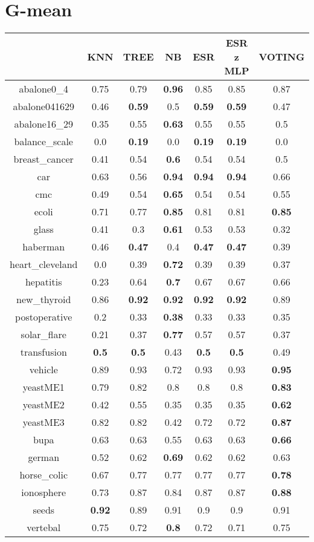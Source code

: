 \documentclass{article}%
\begin{document}
%
\section*{G{-}mean}%
\begin{tabular}{c|cccccc}%
\hline%
&KNN&TREE&NB&ESR&ESR z MLP&VOTING\\%
\hline%
abalone0\_4&0.75&0.79&\textbf{0.96}&0.85&0.85&0.87\\%
\hline%
abalone041629&0.46&\textbf{0.59}&0.5&\textbf{0.59}&\textbf{0.59}&0.47\\%
\hline%
abalone16\_29&0.35&0.55&\textbf{0.63}&0.55&0.55&0.5\\%
\hline%
balance\_scale&0.0&\textbf{0.19}&0.0&\textbf{0.19}&\textbf{0.19}&0.0\\%
\hline%
breast\_cancer&0.41&0.54&\textbf{0.6}&0.54&0.54&0.5\\%
\hline%
car&0.63&0.56&\textbf{0.94}&\textbf{0.94}&\textbf{0.94}&0.66\\%
\hline%
cmc&0.49&0.54&\textbf{0.65}&0.54&0.54&0.55\\%
\hline%
ecoli&0.71&0.77&\textbf{0.85}&0.81&0.81&\textbf{0.85}\\%
\hline%
glass&0.41&0.3&\textbf{0.61}&0.53&0.53&0.32\\%
\hline%
haberman&0.46&\textbf{0.47}&0.4&\textbf{0.47}&\textbf{0.47}&0.39\\%
\hline%
heart\_cleveland&0.0&0.39&\textbf{0.72}&0.39&0.39&0.37\\%
\hline%
hepatitis&0.23&0.64&\textbf{0.7}&0.67&0.67&0.66\\%
\hline%
new\_thyroid&0.86&\textbf{0.92}&\textbf{0.92}&\textbf{0.92}&\textbf{0.92}&0.89\\%
\hline%
postoperative&0.2&0.33&\textbf{0.38}&0.33&0.33&0.35\\%
\hline%
solar\_flare&0.21&0.37&\textbf{0.77}&0.57&0.57&0.37\\%
\hline%
transfusion&\textbf{0.5}&\textbf{0.5}&0.43&\textbf{0.5}&\textbf{0.5}&0.49\\%
\hline%
vehicle&0.89&0.93&0.72&0.93&0.93&\textbf{0.95}\\%
\hline%
yeastME1&0.79&0.82&0.8&0.8&0.8&\textbf{0.83}\\%
\hline%
yeastME2&0.42&0.55&0.35&0.35&0.35&\textbf{0.62}\\%
\hline%
yeastME3&0.82&0.82&0.42&0.72&0.72&\textbf{0.87}\\%
\hline%
bupa&0.63&0.63&0.55&0.63&0.63&\textbf{0.66}\\%
\hline%
german&0.52&0.62&\textbf{0.69}&0.62&0.62&0.63\\%
\hline%
horse\_colic&0.67&0.77&0.77&0.77&0.77&\textbf{0.78}\\%
\hline%
ionosphere&0.73&0.87&0.84&0.87&0.87&\textbf{0.88}\\%
\hline%
seeds&\textbf{0.92}&0.89&0.91&0.9&0.9&0.91\\%
\hline%
vertebal&0.75&0.72&\textbf{0.8}&0.72&0.71&0.75\\%
\hline%
\end{tabular}

%
\end{document}
